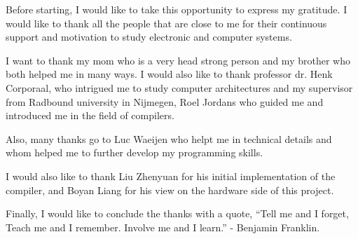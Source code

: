 Before starting, I would like to take this opportunity to express my gratitude. I would like to thank all the people that are close to me for their continuous support and motivation to study electronic and computer systems.

I want to thank my mom who is a very head strong person and my brother who both helped me in many ways. I would also like to thank professor dr. Henk Corporaal, who intrigued me to study computer architectures and my supervisor from Radbound university in Nijmegen, Roel Jordans who guided me and introduced me in the field of compilers.

Also, many thanks go to Luc Waeijen who helpt me in technical details and whom helped me to further develop my programming skills.

I would also like to thank Liu Zhenyuan for his initial implementation of the compiler, and Boyan Liang for his view on the hardware side of this project.

Finally, I would like to conclude the thanks with a quote, ``Tell me and I forget, Teach me and I remember. Involve me and I learn.'' - Benjamin Franklin.




